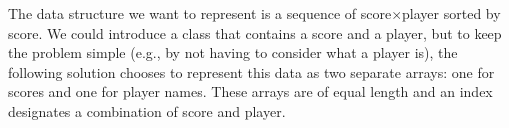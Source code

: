 The data structure we want to represent is a sequence of score$\times$player sorted by score. We could introduce a  class that contains a score and a player, but to keep the problem simple (e.g., by not having to consider what a player is), the following solution chooses to represent this data as two separate arrays: one for scores and one for player names. These arrays are of equal length and an index designates a combination of score and player.

\inputminted{csharp}{\context/answer/Highscores.cs}
